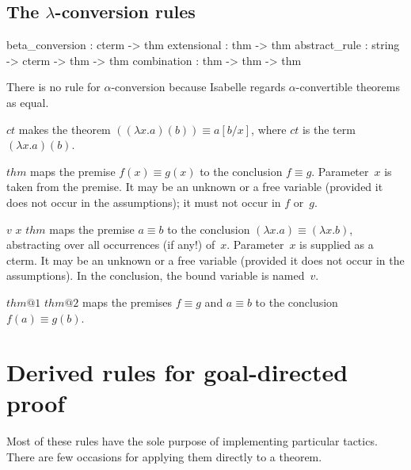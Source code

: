 \subsection{The $\lambda$-conversion rules}
\begin{ttbox} 
beta_conversion : cterm -> thm
extensional     : thm -> thm
abstract_rule   : string -> cterm -> thm -> thm
combination     : thm -> thm -> thm
\end{ttbox} 
There is no rule for $\alpha$-conversion because Isabelle regards
$\alpha$-convertible theorems as equal.
\begin{ttdescription}
\item[\ttindexbold{beta_conversion} $ct$] 
makes the theorem $((\lambda x.a)(b)) \equiv a[b/x]$, where $ct$ is the
term $(\lambda x.a)(b)$.

\item[\ttindexbold{extensional} $thm$] 
maps the premise $f(x) \equiv g(x)$ to the conclusion $f\equiv g$.
Parameter~$x$ is taken from the premise.  It may be an unknown or a free
variable (provided it does not occur in the assumptions); it must not occur
in $f$ or~$g$.

\item[\ttindexbold{abstract_rule} $v$ $x$ $thm$] 
maps the premise $a\equiv b$ to the conclusion $(\lambda x.a) \equiv
(\lambda x.b)$, abstracting over all occurrences (if any!) of~$x$.
Parameter~$x$ is supplied as a cterm.  It may be an unknown or a free
variable (provided it does not occur in the assumptions).  In the
conclusion, the bound variable is named~$v$.

\item[\ttindexbold{combination} $thm@1$ $thm@2$] 
maps the premises $f\equiv g$ and $a\equiv b$ to the conclusion~$f(a)\equiv
g(b)$.
\end{ttdescription}


\section{Derived rules for goal-directed proof}
Most of these rules have the sole purpose of implementing particular
tactics.  There are few occasions for applying them directly to a theorem.

